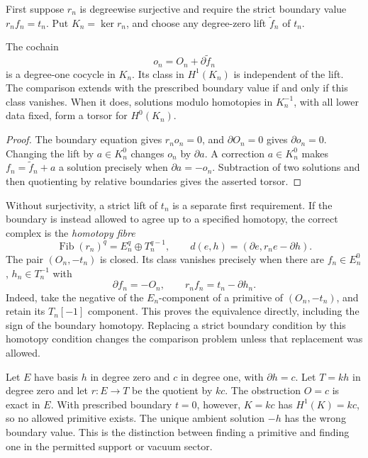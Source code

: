 First suppose \(r_n\) is degreewise surjective and require the
strict boundary value \(r_nf_n=t_n\). Put \(K_n=\ker r_n\),
and choose any degree-zero lift \(\widetilde f_n\) of \(t_n\).

\begin{theorem}
\label{v4-thm:recognition-relative}
The cochain
\[
 o_n=O_n+\partial\widetilde f_n
\]
is a degree-one cocycle in \(K_n\). Its class in \(H^1(K_n)\)
is independent of the lift. The comparison extends with the
prescribed boundary value if and only if this class vanishes.
When it does, solutions modulo homotopies in \(K_n^{-1}\),
with all lower data fixed, form a torsor for \(H^0(K_n)\).
\end{theorem}

\begin{proof}
The boundary equation gives \(r_no_n=0\), and
\(\partial O_n=0\) gives \(\partial o_n=0\). Changing the
lift by \(a\in K_n^0\) changes \(o_n\) by \(\partial a\).
A correction \(a\in K_n^0\) makes
\(f_n=\widetilde f_n+a\) a solution precisely when
\(\partial a=-o_n\). Subtraction of two solutions and then
quotienting by relative boundaries gives the asserted torsor.
\end{proof}

Without surjectivity, a strict lift of \(t_n\) is a separate
first requirement. If the boundary is instead allowed to agree
up to a specified homotopy, the correct complex is the
\emph{homotopy fibre}
\begin{equation}\label{v4-eq:recognition-fibre}
 \operatorname{Fib}(r_n)^q=E_n^q\oplus T_n^{q-1},
 \qquad d(e,h)=(\partial e,r_ne-\partial h).
\end{equation}
The pair \((O_n,-t_n)\) is closed. Its class vanishes precisely
when there are \(f_n\in E_n^0\), \(h_n\in T_n^{-1}\) with
\[
 \partial f_n=-O_n,\qquad
 r_nf_n=t_n-\partial h_n.
\]
Indeed, take the negative of the \(E_n\)-component of a
primitive of \((O_n,-t_n)\), and retain its \(T_n[-1]\)
component. This proves the equivalence directly, including the
sign of the boundary homotopy. Replacing a strict boundary
condition by this homotopy condition changes the comparison
problem unless that replacement was allowed.

\begin{example}
\label{v4-ex:recognition-forbidden-primitive}
Let \(E\) have basis \(h\) in degree zero and \(c\) in
degree one, with \(\partial h=c\). Let \(T=kh\) in degree
zero and let \(r:E\to T\) be the quotient by \(kc\).
The obstruction \(O=c\) is exact in \(E\). With prescribed
boundary \(t=0\), however, \(K=kc\) has
\(H^1(K)=kc\), so no allowed primitive exists. The unique
ambient solution \(-h\) has the wrong boundary value. This is
the distinction between finding a primitive and finding one in
the permitted support or vacuum sector.
\end{example}

